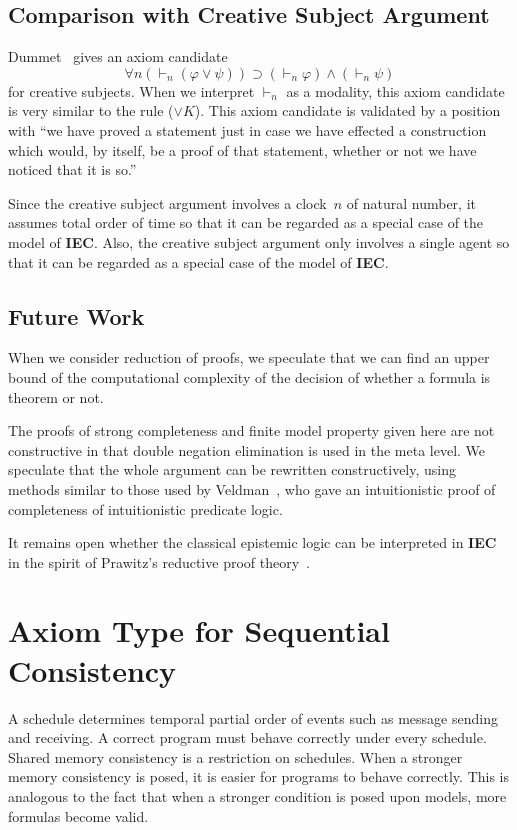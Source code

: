 \documentclass[doctor]{iscs-thesis}
\newcommand{\iec}{{\rm {\textbf{IEC}}}}
\begin{document}
\subsection{Comparison with Creative Subject Argument}

Dummet~\cite[Subsection 6.3]{dummett2000elements} gives an axiom candidate
\[
 \forall n (\vdash_n (\varphi\vee \psi)) \supset (\vdash_n \varphi)\wedge (\vdash_n \psi)
\]
for creative subjects.
When we interpret $\vdash_n$ as a modality, this axiom candidate is very similar to the
rule ($\vee K$).
This axiom candidate is validated by a position with
``we have proved a statement just in case we have effected a construction which would, by
itself, be a proof of that statement, whether or not we have noticed that it is so.''

Since the creative subject argument involves a clock~$n$ of natural number,
it assumes total order of time so that it can be regarded as a special case of the model of \iec.
Also, the creative subject argument only involves a single agent so that it can be
regarded as a special
case of the model of \iec.

\subsection{Future Work}

When we consider reduction of proofs, we speculate that we can find an upper bound of the
computational complexity of the decision of whether a formula is theorem or not.

The proofs of strong completeness and finite model property given here are
not constructive in that double negation elimination is used in the meta level.
We speculate that the whole argument can be rewritten constructively,
using methods similar to those used by
Veldman~\cite{veldman1976intuitionistic}, who
gave an intuitionistic proof of completeness of intuitionistic predicate logic.

It remains open whether the classical epistemic logic can be interpreted in \iec\,
in the spirit of Prawitz's reductive proof theory~\cite{prawitz1971ideas}.

\section{Axiom Type for Sequential Consistency}
\label{sc}

A schedule determines temporal partial order of events such as
message sending and receiving.
A correct program must behave correctly under every schedule.
Shared memory consistency is a restriction on schedules.
When a stronger memory consistency is posed, it is easier for programs to behave
correctly.  This is analogous to the fact
that when a stronger condition
is posed upon models, more formulas become valid.
\end{document}
